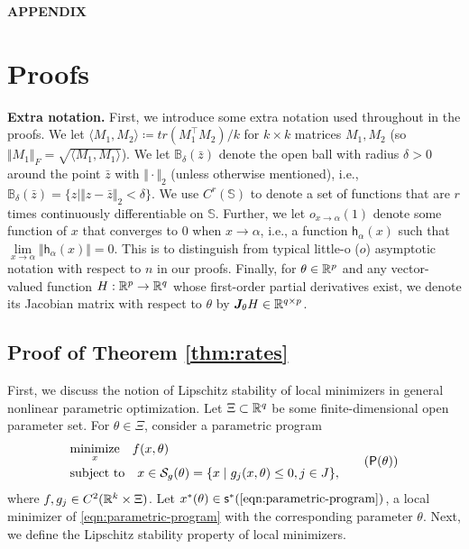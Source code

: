 \begin{center}
{\large\bf APPENDIX}
\end{center}
\vspace*{.1in}
\setcounter{page}{1}

\section{Proofs}

\textbf{Extra notation.} First, we introduce some extra notation used throughout in the proofs. We let $\langle M_1, M_2 \rangle \coloneqq tr\left(M_1^\top M_2\right)/k$ for $k\times k$ matrices $M_1, M_2$ (so $\Vert M_1 \Vert_F = \sqrt{\langle M_1, M_1 \rangle}$). We let $\mathbb{B}_{\delta}(\bar{z})$ denote the open ball with radius $\delta > 0$ around the point $\bar{z}$ with  $\Vert \cdot \Vert_2$ (unless otherwise mentioned), i.e., $\mathbb{B}_{\delta}(\bar{z})= \{z \mid \Vert z - \bar{z} \Vert_2 < \delta \}$. We use $C^r(\mathbb{S})$ to denote a set of functions that are $r$ times continuously differentiable on $\mathbb{S}$. Further, we let $o_{x \rightarrow \alpha}(1)$ denote some function of $x$ that converges to $0$ when $x \rightarrow \alpha$, i.e., a function $\mathsf{h}_{\alpha}(x)$ such that $\underset{x \rightarrow \alpha}{\lim} \Vert{\mathsf{h}}_{\alpha}(x)\Vert = 0$. This is to distinguish from typical little-o ($o$) asymptotic notation with respect to $n$ in our proofs. Finally, for $\theta \in \mathbb{R}^{p}$ and any vector-valued function $H : \mathbb{R}^{p} \rightarrow \mathbb{R}^{q}$ whose first-order partial derivatives exist, we denote its Jacobian matrix with respect to $\theta$ by $\bm{J}_\theta H \in \mathbb{R}^{q \times p}$. 




\subsection{Proof of Theorem \ref{thm:rates}} \label{proof:rates}
First, we discuss the notion of Lipschitz stability of local minimizers in general nonlinear parametric optimization. Let $\Xi \subset \mathbb{R}^q$ be some finite-dimensional open parameter set. For $\theta \in \Xi$, consider a parametric program
\begin{equation}
\label{eqn:parametric-program}
\begin{aligned}
    & \underset{x}{\text{minimize}} \quad f(x, \theta) \\
    & \text{subject to} \quad x \in \mathcal{S}_{g}(\theta) = \{x \mid g_j(x,\theta) \leq 0, j \in J\},
\end{aligned}     \tag{$\mathsf{P}(\theta)$}  
\end{equation}
where $f,g_j \in C^2(\mathbb{R}^k \times \Xi)$. Let $x^*(\theta) \in \mathsf{s}^*(\text{\ref{eqn:parametric-program}})$, a local minimizer of \ref{eqn:parametric-program} with the corresponding parameter $\theta$. Next, we define the Lipschitz stability property of local minimizers.

